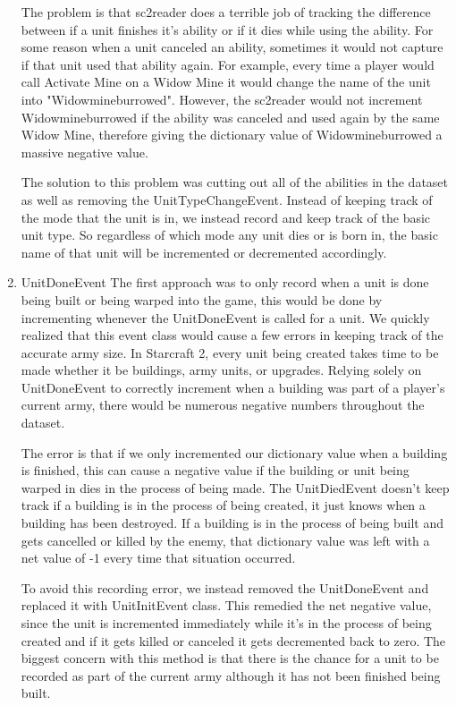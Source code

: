 \documentclass[a4paper,12pt]{report}
\begin{document}
\begin{enumerate}
The problem is that sc2reader does a terrible job of tracking the difference between if a unit finishes it’s ability or if it dies while using the ability. For some reason when a unit canceled an ability, sometimes it would not capture if that unit used that ability again. For example, every time a player would call Activate Mine on a Widow Mine it would change the name of the unit into "Widowmineburrowed". However, the sc2reader would not increment Widowmineburrowed if the ability was canceled and used again by the same Widow Mine, therefore giving the dictionary value of Widowmineburrowed a massive negative value.

The solution to this problem was cutting out all of the abilities in the dataset as well as removing the UnitTypeChangeEvent. Instead of keeping track of the mode that the unit is in, we instead record and keep track of the basic unit type. So regardless of which mode any unit dies or is born in, the basic name of that unit will be incremented or decremented accordingly. 

\item UnitDoneEvent
The first approach was to only record when a unit is done being built or being warped into the game, this would be done by incrementing whenever the UnitDoneEvent is called for a unit. We quickly realized that this event class would cause a few errors in keeping track of the accurate army size. In Starcraft 2, every unit being created takes time to be made whether it be buildings, army units, or upgrades. Relying solely on UnitDoneEvent to correctly increment when a building was part of a player’s current army, there would be numerous negative numbers throughout the dataset.

The error is that if we only incremented our dictionary value when a building is finished, this can cause a negative value if the building or unit being warped in dies in the process of being made. The UnitDiedEvent doesn’t keep track if a building is in the process of being created, it just knows when a building has been destroyed. If a building is in the process of being built and gets cancelled or killed by the enemy, that dictionary value was left with a net value of -1 every time that situation occurred. 

To avoid this recording error, we instead removed the UnitDoneEvent and replaced it with UnitInitEvent class. This remedied the net negative value, since the unit is incremented immediately while it’s in the process of being created and if it gets killed or canceled it gets decremented back to zero. The biggest concern with this method is that there is the chance for a unit to be recorded as part of the current army although it has not been finished being built. 
\end{enumerate}
\end{document}
